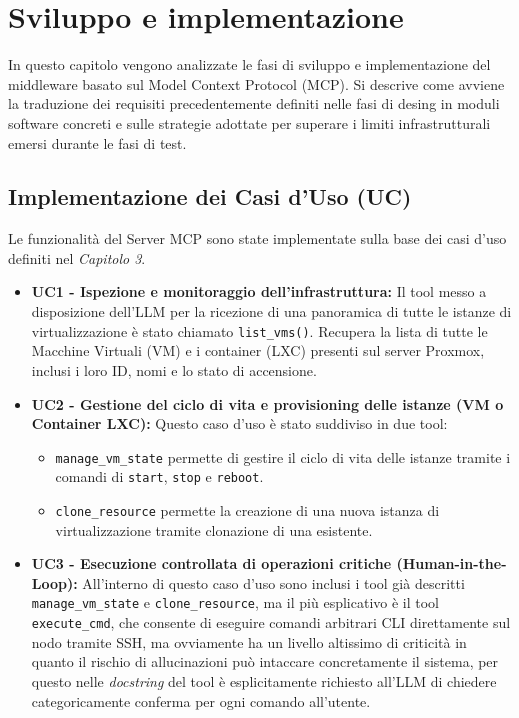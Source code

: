 \chapter{Sviluppo e implementazione}
In questo capitolo vengono analizzate le fasi di sviluppo e implementazione del middleware basato sul Model Context Protocol (MCP). Si descrive come avviene la traduzione dei requisiti precedentemente definiti nelle fasi di desing in moduli software concreti e sulle strategie adottate per superare i limiti infrastrutturali emersi durante le fasi di test.

\section{Implementazione dei Casi d'Uso (UC)}
Le funzionalità del Server MCP sono state implementate sulla base dei casi d'uso definiti nel  \textit{Capitolo 3}.
\begin{itemize}
    \item \textbf{UC1 - Ispezione e monitoraggio dell’infrastruttura:} Il tool messo a disposizione dell'LLM per la ricezione di una panoramica di tutte le istanze di virtualizzazione è stato chiamato \texttt{list\_vms()}. Recupera la lista di tutte le Macchine Virtuali (VM) e i container (LXC)
    presenti sul server Proxmox, inclusi i loro ID, nomi e lo stato di accensione.
    \item \textbf{UC2 - Gestione del ciclo di vita e provisioning delle istanze (VM o Container LXC):}
    Questo caso d'uso è stato suddiviso in due tool:
    \begin{itemize}
        \item \texttt{manage\_vm\_state} permette di gestire il ciclo di vita delle istanze tramite i comandi di \texttt{start}, \texttt{stop} e \texttt{reboot}.
        \item \texttt{clone\_resource} permette la creazione di una nuova istanza di virtualizzazione tramite clonazione di una esistente.
    \end{itemize}
    \item \textbf{UC3 - Esecuzione controllata di operazioni critiche (Human-in-the-Loop):}
    All'interno di questo caso d'uso sono inclusi i tool già descritti \texttt{manage\_vm\_state} e \texttt{clone\_resource}, ma il più esplicativo è il tool \texttt{execute\_cmd}, che consente di eseguire comandi arbitrari CLI direttamente sul nodo tramite SSH, ma ovviamente ha un livello altissimo di criticità in quanto il rischio di allucinazioni può intaccare concretamente il sistema, per questo nelle \textit{docstring} del tool è esplicitamente richiesto all'LLM di chiedere categoricamente conferma per ogni comando all'utente.
\end{itemize}

